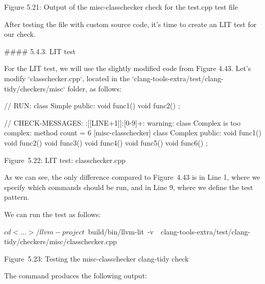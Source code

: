 \begin{shell}
test.cpp:1:7: warning: class Simple is too complex: method count = 3
[misc-classchecker]
class Simple {
    ^
\end{shell}

\begin{markdown}

\begin{center}
Figure 5.21: Output of the misc-classchecker check for the test.cpp test file
\end{center}

After testing the file with custom source code, it's time to create an LIT test for our check.

#### 5.4.3. LIT test

For the LIT test, we will use the slightly modified code from Figure 4.43. Let's modify `classchecker.cpp`, located in the `clang-tools-extra/test/clang-tidy/checkers/misc` folder, as follows:
\end{markdown}

\begin{cpp}
// RUN: %
class Simple {
public:
  void func1() {}
  void func2() {}
};

// CHECK-MESSAGES: :[[LINE+1]]:{{[0-9]+}}: warning: class Complex is too complex: method count = 6 [misc-classchecker]
class Complex {
public:
  void func1() {}
  void func2() {}
  void func3() {}
  void func4() {}
  void func5() {}
  void func6() {}
};
\end{cpp}

\begin{center}
Figure 5.22: LIT test: classchecker.cpp
\end{center}

As we can see, the only difference compared to Figure 4.43 is in Line 1, where we specify which commands should be run, and in Line 9, where we define the test pattern.

We can run the test as follows:

\begin{shell}
$ cd <...>/llvm-project
$ build/bin/llvm-lit -v \
clang-tools-extra/test/clang-tidy/checkers/misc/classchecker.cpp
\end{shell}

\begin{center}
Figure 5.23: Testing the misc-classchecker clang-tidy check
\end{center}

The command produces the following output:

